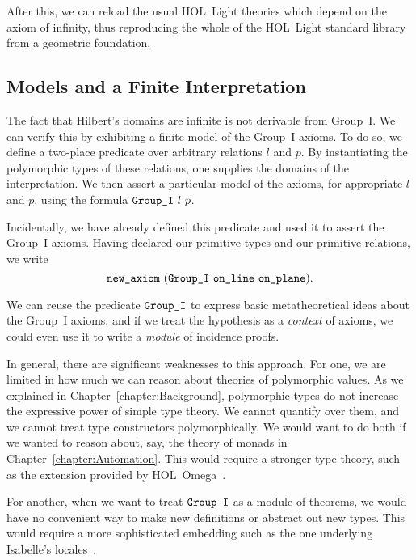 After this, we can reload the usual HOL~Light theories which depend on the axiom of infinity, thus reproducing the whole of the HOL~Light standard library from a geometric foundation.

\subsection{Models and a Finite Interpretation}\label{sec:FiniteModel}
The fact that Hilbert's domains are infinite is not derivable from Group~I. We can verify this by exhibiting a finite model of the Group~I axioms. To do so, we define a two-place predicate  over arbitrary relations $l$ and $p$. By instantiating the polymorphic types of these relations, one supplies the domains of the interpretation. We then assert a particular model of the axioms, for appropriate $l$ and $p$, using the formula $\code{Group\_I}\ l\ p$.

Incidentally, we have already defined this predicate and used it to assert the Group~I axioms. Having declared our primitive types and our primitive relations, we write
\begin{displaymath}
  \code{new\_axiom}\ (\code{Group\_I}\ \code{on\_line}\ \code{on\_plane}).
\end{displaymath}

We can reuse the predicate $\texttt{Group\_I}$ to express basic metatheoretical ideas about the Group~I axioms, and if we treat the hypothesis as a \emph{context} of axioms, we could even use it to write a \emph{module} of incidence proofs. 

In general, there are significant weaknesses to this approach. For one, we are limited in how much we can reason about theories of polymorphic values. As we explained in Chapter~\ref{chapter:Background}, polymorphic types do not increase the expressive power of simple type theory. We cannot quantify over them, and we cannot treat type constructors polymorphically. We would want to do both if we wanted to reason about, say, the theory of monads in Chapter~\ref{chapter:Automation}. This would require a stronger type theory, such as the extension provided by HOL~Omega~\cite{HOLOmega}.

For another, when we want to treat $\texttt{Group\_I}$ as a module of theorems, we would have no convenient way to make new definitions or abstract out new types. This would require a more sophisticated embedding such as the one underlying Isabelle's locales~\cite{IsabelleLocales}.

